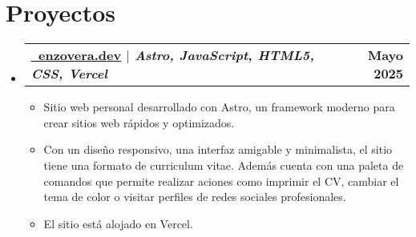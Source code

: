 \documentclass[letterpaper,11pt]{article}
\makeatletter
\newcommand{\resumeItem}[1]{
  \item\small{
    #1 
  }
}
\newcommand{\resumeProjectHeading}[2]{
    \item
    \begin{tabular*}{1.001\textwidth}{l@{\extracolsep{\fill}}r}
      \small#1 & \textbf{\small #2}\\
    \end{tabular*}\vspace{-7pt}
}
\newcommand{\resumeSubHeadingListStart}{\begin{itemize}[leftmargin=0.0in, label={}]}
\newcommand{\resumeSubHeadingListEnd}{\end{itemize}}
\newcommand{\resumeItemListStart}{\begin{itemize}[leftmargin=3em]}
\newcommand{\resumeItemListEnd}{\end{itemize}\vspace{1pt}}
\makeatother
\begin{document}
\section{Proyectos}
    \vspace{-5pt}
    \resumeSubHeadingListStart
      \resumeProjectHeading
          {\textbf{\href{https://enzovera.dev/}{\raisebox{-0.2\height}\faDesktop\ \underline{enzovera.dev}} $|$ \emph{Astro, JavaScript, HTML5, CSS, Vercel}}}{Mayo 2025}
          \resumeItemListStart
            \resumeItem{Sitio web personal desarrollado con Astro, un framework moderno para crear sitios web rápidos y optimizados.}
            \resumeItem{Con un diseño responsivo, una interfaz amigable y minimalista, el sitio tiene una formato de curriculum vitae. Además cuenta con una paleta de comandos que permite realizar aciones como imprimir el CV, cambiar el tema de color o visitar perfiles de redes sociales profesionales.}
            \resumeItem{El sitio está alojado en Vercel.}
          \resumeItemListEnd
          \vspace{-13pt}
    
    \resumeSubHeadingListEnd
\vspace{-15pt}
\end{document}
